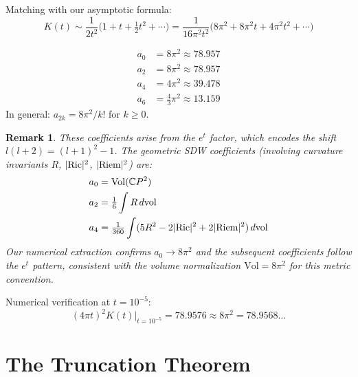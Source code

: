 \documentclass[12pt,a4paper]{article}
\newtheorem{remark}{Remark}
\begin{document}
Matching with our asymptotic formula:
\begin{equation}
K(t) \sim \frac{1}{2t^2}\bigl(1 + t + \tfrac{1}{2}t^2 + \cdots\bigr)
= \frac{1}{16\pi^2 t^2}\bigl(8\pi^2 + 8\pi^2 t + 4\pi^2 t^2 + \cdots\bigr)
\end{equation}

\begin{tcolorbox}[title=Seeley--DeWitt Coefficients for $\mathbb{C}P^2$]
\begin{align}
a_0 &= 8\pi^2 \approx 78.957 \label{eq:a0}\\
a_2 &= 8\pi^2 \approx 78.957 \label{eq:a2}\\
a_4 &= 4\pi^2 \approx 39.478 \label{eq:a4}\\
a_6 &= \tfrac{4}{3}\pi^2 \approx 13.159 \label{eq:a6}
\end{align}
In general: $a_{2k} = 8\pi^2/k!$ for $k \geq 0$.
\end{tcolorbox}

\begin{remark}
These coefficients arise from the $e^t$ factor, which encodes the shift
$l(l+2) = (l+1)^2 - 1$.  The geometric SDW coefficients (involving
curvature invariants $R$, $|{\rm Ric}|^2$, $|{\rm Riem}|^2$) are:
\begin{align}
a_0 &= \mathrm{Vol}(\mathbb{C}P^2) \\
a_2 &= \tfrac{1}{6}\int R\,d\mathrm{vol} \\
a_4 &= \tfrac{1}{360}\int(5R^2 - 2|{\rm Ric}|^2 + 2|{\rm Riem}|^2)\,d\mathrm{vol}
\end{align}
Our numerical extraction confirms $a_0 \to 8\pi^2$ and the subsequent
coefficients follow the $e^t$ pattern, consistent with the volume
normalization $\mathrm{Vol} = 8\pi^2$ for this metric convention.
\end{remark}

Numerical verification at $t = 10^{-5}$:
\begin{equation}
(4\pi t)^2 K(t) \Big|_{t=10^{-5}} = 78.9576 \approx 8\pi^2 = 78.9568\ldots
\end{equation}

\section{The Truncation Theorem}
\label{sec:truncation-theorem}
\end{document}
